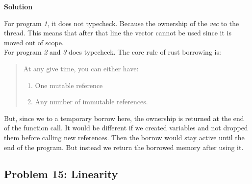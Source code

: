 \textbf{Solution}

For program \textit{1}, it does not typecheck. Because the ownership of the \textit{vec} to the thread. 
This means that after that line the vector cannot be used since it is moved out of scope. \\

For program \textit{2} and \textit{3} does typecheck. The core rule of rust borrowing is: 
\begin{quote}
    At any give time, you can either have:
    \begin{enumerate}
        \item One mutable reference 
        \item Any number of immutable references. 
    \end{enumerate}
\end{quote}

But, since we to a temporary borrow here, the ownership is returned at the end of the function call. It would be different if we created variables and not dropped them before calling new references. 
Then the borrow would stay active until the end of the program. But instead we return the borrowed memory after using it. 


\subsection{Problem 15: Linearity}